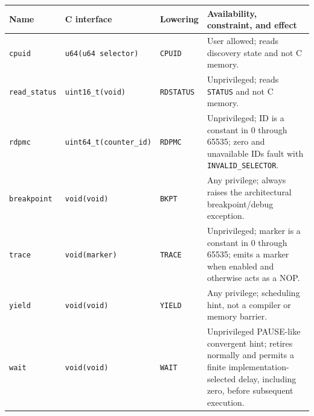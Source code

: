 \begingroup\footnotesize
\setlength{\tabcolsep}{2pt}
\begin{longtable}{@{}p{1.25in}p{1.25in}p{0.8in}p{2.3in}@{}}
\toprule
\textbf{Name} & \textbf{C interface} & \textbf{Lowering} & \textbf{Availability, constraint, and effect}\\
\midrule
\endhead
\texttt{cpuid} & \texttt{u64(u64 selector)} & \texttt{CPUID} & User allowed; reads discovery state and not C memory.\\
\texttt{read\_status} & \texttt{uint16\_t(void)} & \texttt{RDSTATUS} & Unprivileged; reads \texttt{STATUS} and not C memory.\\
\texttt{rdpmc} & \texttt{uint64\_t(counter\_id)} & \texttt{RDPMC} & Unprivileged; ID is a constant in 0 through 65535; zero and unavailable IDs fault with \texttt{INVALID\_SELECTOR}.\\
\texttt{breakpoint} & \texttt{void(void)} & \texttt{BKPT} & Any privilege; always raises the architectural breakpoint/debug exception.\\
\texttt{trace} & \texttt{void(marker)} & \texttt{TRACE} & Unprivileged; marker is a constant in 0 through 65535; emits a marker when enabled and otherwise acts as a NOP.\\
\texttt{yield} & \texttt{void(void)} & \texttt{YIELD} & Any privilege; scheduling hint, not a compiler or memory barrier.\\
\texttt{wait} & \texttt{void(void)} & \texttt{WAIT} & Unprivileged PAUSE-like convergent hint; retires normally and permits a finite implementation-selected delay, including zero, before subsequent execution.\\
\bottomrule
\end{longtable}
\endgroup
